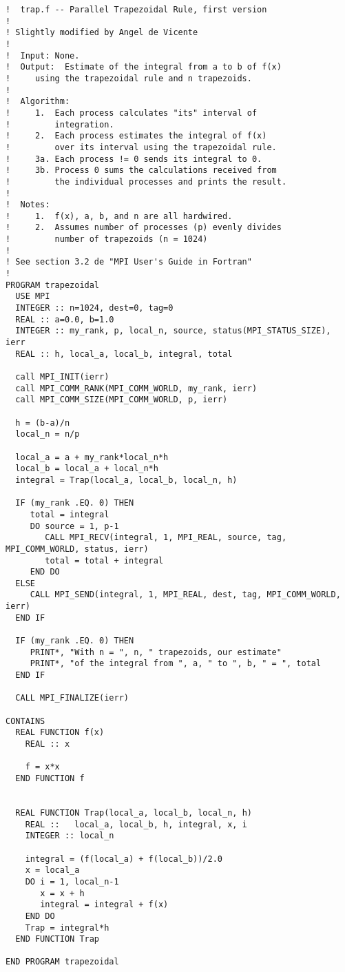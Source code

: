 \begin{verbatim}
!  trap.f -- Parallel Trapezoidal Rule, first version
!
! Slightly modified by Angel de Vicente
!
!  Input: None.
!  Output:  Estimate of the integral from a to b of f(x) 
!     using the trapezoidal rule and n trapezoids.
! 
!  Algorithm:
!     1.  Each process calculates "its" interval of 
!         integration.
!     2.  Each process estimates the integral of f(x)
!         over its interval using the trapezoidal rule.
!     3a. Each process != 0 sends its integral to 0.
!     3b. Process 0 sums the calculations received from
!         the individual processes and prints the result.
! 
!  Notes:  
!     1.  f(x), a, b, and n are all hardwired.
!     2.  Assumes number of processes (p) evenly divides
!         number of trapezoids (n = 1024)
!
! See section 3.2 de "MPI User's Guide in Fortran"
!
PROGRAM trapezoidal
  USE MPI
  INTEGER :: n=1024, dest=0, tag=0
  REAL :: a=0.0, b=1.0
  INTEGER :: my_rank, p, local_n, source, status(MPI_STATUS_SIZE), ierr
  REAL :: h, local_a, local_b, integral, total
  
  call MPI_INIT(ierr)
  call MPI_COMM_RANK(MPI_COMM_WORLD, my_rank, ierr)
  call MPI_COMM_SIZE(MPI_COMM_WORLD, p, ierr)
	
  h = (b-a)/n
  local_n = n/p
	
  local_a = a + my_rank*local_n*h
  local_b = local_a + local_n*h
  integral = Trap(local_a, local_b, local_n, h)
	
  IF (my_rank .EQ. 0) THEN
     total = integral
     DO source = 1, p-1
        CALL MPI_RECV(integral, 1, MPI_REAL, source, tag, MPI_COMM_WORLD, status, ierr)
        total = total + integral
     END DO
  ELSE
     CALL MPI_SEND(integral, 1, MPI_REAL, dest, tag, MPI_COMM_WORLD, ierr)
  END IF
	
  IF (my_rank .EQ. 0) THEN
     PRINT*, "With n = ", n, " trapezoids, our estimate"
     PRINT*, "of the integral from ", a, " to ", b, " = ", total
  END IF

  CALL MPI_FINALIZE(ierr) 

CONTAINS
  REAL FUNCTION f(x)
    REAL :: x

    f = x*x
  END FUNCTION f


  REAL FUNCTION Trap(local_a, local_b, local_n, h)
    REAL ::   local_a, local_b, h, integral, x, i
    INTEGER :: local_n

    integral = (f(local_a) + f(local_b))/2.0 
    x = local_a 
    DO i = 1, local_n-1
       x = x + h 
       integral = integral + f(x) 
    END DO
    Trap = integral*h 
  END FUNCTION Trap

END PROGRAM trapezoidal
\end{verbatim}
  
